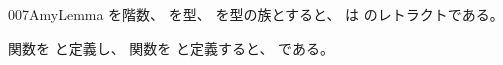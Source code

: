 \documentclass[index]{subfiles}
\begin{document}
\begin{myBlock}{007A}{myLemma}
  を階数、
  を型、
  を型の族とすると、
  は
  のレトラクトである。
\end{myBlock}
\begin{myProof}
  関数を
  と定義し、
  関数を
  と定義すると、
  である。
\end{myProof}
\end{document}
